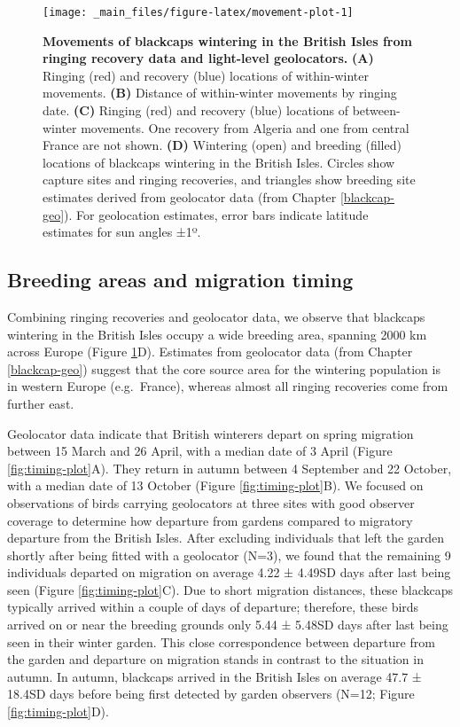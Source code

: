 \documentclass[a4paper, nobind]{templates/ociamthesis}
\begin{document}
\begin{figure}
\texttt{[image: \_main\_files/figure-latex/movement-plot-1]} \caption{\textbf{Movements of blackcaps wintering in the British Isles from ringing recovery data and light-level geolocators.} \textbf{(A)} Ringing (red) and recovery (blue) locations of within-winter movements. \textbf{(B)} Distance of within-winter movements by ringing date. \textbf{(C)} Ringing (red) and recovery (blue) locations of between-winter movements. One recovery from Algeria and one from central France are not shown. \textbf{(D)} Wintering (open) and breeding (filled) locations of blackcaps wintering in the British Isles. Circles show capture sites and ringing recoveries, and triangles show breeding site estimates derived from geolocator data (from Chapter \ref{blackcap-geo}). For geolocation estimates, error bars indicate latitude estimates for sun angles ±1º.}\label{fig:movement-plot}
\end{figure}

\hypertarget{breeding-areas-and-migration-timing}{%
\subsection{Breeding areas and migration timing}\label{breeding-areas-and-migration-timing}}

Combining ringing recoveries and geolocator data, we observe that blackcaps wintering in the British Isles occupy a wide breeding area, spanning 2000 km across Europe (Figure \ref{fig:movement-plot}D). Estimates from geolocator data (from Chapter \ref{blackcap-geo}) suggest that the core source area for the wintering population is in western Europe (e.g.~France), whereas almost all ringing recoveries come from further east.

Geolocator data indicate that British winterers depart on spring migration between 15 March and 26 April, with a median date of 3 April (Figure \ref{fig:timing-plot}A). They return in autumn between 4 September and 22 October, with a median date of 13 October (Figure \ref{fig:timing-plot}B). We focused on observations of birds carrying geolocators at three sites with good observer coverage to determine how departure from gardens compared to migratory departure from the British Isles. After excluding individuals that left the garden shortly after being fitted with a geolocator (N=3), we found that the remaining 9 individuals departed on migration on average 4.22 ± 4.49SD days after last being seen (Figure \ref{fig:timing-plot}C). Due to short migration distances, these blackcaps typically arrived within a couple of days of departure; therefore, these birds arrived on or near the breeding grounds only 5.44 ± 5.48SD days after last being seen in their winter garden. This close correspondence between departure from the garden and departure on migration stands in contrast to the situation in autumn. In autumn, blackcaps arrived in the British Isles on average 47.7 ± 18.4SD days before being first detected by garden observers (N=12; Figure \ref{fig:timing-plot}D).
\end{document}
